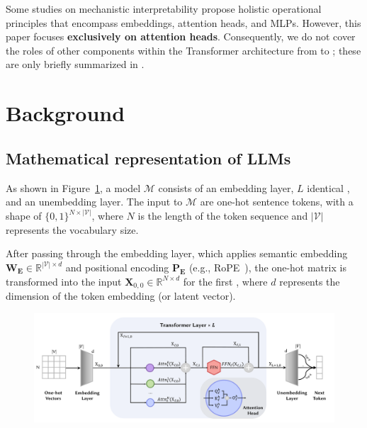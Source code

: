 \documentclass[12pt,letterpaper]{article}
\begin{document}
Some studies on mechanistic interpretability propose holistic operational principles that encompass embeddings, attention heads, and MLPs. However, this paper focuses \textbf{exclusively on attention heads}. Consequently, we do not cover the roles of other components within the Transformer architecture from  to ; these are only briefly summarized in .

\section*{Background} \label{sec:background}
\subsection*{Mathematical representation of LLMs} \label{subsec:Math}

As shown in Figure~\ref{fig:LLMStructure}, a model $\mathcal{M}$ consists of an embedding layer, $L$ identical , and an unembedding layer. The input to $\mathcal{M}$ are one-hot sentence tokens, with a shape of $\{0,1\}^{N \times |\mathcal{V}|}$, where $N$ is the length of the token sequence and $|\mathcal{V}|$ represents the vocabulary size.

After passing through the embedding layer, which applies semantic embedding $\mathbf{W_{E}} \in \mathbb{R}^{|\mathcal{V}| \times d}$ and positional encoding $\mathbf{P_{E}}$ (e.g., RoPE~\citep{ROPE_24_Neuro_Zhuiyi}), the one-hot matrix is transformed into the input $\mathbf{X}_{0,0} \in \mathbb{R}^{N \times d}$ for the first , where $d$ represents the dimension of the token embedding (or latent vector).

\begin{figure}[!ht]
    \centering
    \includegraphics[width=\linewidth]{figures/LLMStructure.pdf}
    \caption{}
    \label{fig:LLMStructure}
\end{figure}
\end{document}
